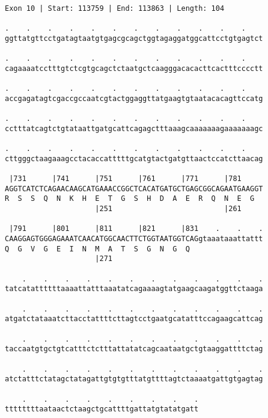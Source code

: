 \documentclass{article}
\begin{document}
\begin{Verbatim}
Exon 10 | Start: 113759 | End: 113863 | Length: 104
 
.    .    .    .    .    .    .    .    .    .    .    .    
ggttatgttcctgatagtaatgtgagcgcagctggtagaggatggcattcctgtgagtct
  
.    .    .    .    .    .    .    .    .    .    .    .    
cagaaaatcctttgtctcgtgcagctctaatgctcaagggacacacttcactttcccctt
  
.    .    .    .    .    .    .    .    .    .    .    .    
accgagatagtcgaccgccaatcgtactggaggttatgaagtgtaatacacagttccatg
  
.    .    .    .    .    .    .    .    .    .    .    .    
cctttatcagtctgtataattgatgcattcagagctttaaagcaaaaaaagaaaaaaagc
  
.    .    .    .    .    .    .    .    .    .    .    .    
cttgggctaagaaagcctacaccatttttgcatgtactgatgttaactccatcttaacag
  
 |731      |741      |751      |761      |771      |781     
AGGTCATCTCAGAACAAGCATGAAACCGGCTCACATGATGCTGAGCGGCAGAATGAAGGT
R  S  S  Q  N  K  H  E  T  G  S  H  D  A  E  R  Q  N  E  G  
                     |251                          |261     
  
 |791      |801      |811      |821      |831    .    .    .
CAAGGAGTGGGAGAAATCAACATGGCAACTTCTGGTAATGGTCAGgtaaataaattattt
Q  G  V  G  E  I  N  M  A  T  S  G  N  G  Q                 
                     |271                                   
  
    .    .    .    .    .    .    .    .    .    .    .    .
tatcatattttttaaaattatttaaatatcagaaaagtatgaagcaagatggttctaaga
  
    .    .    .    .    .    .    .    .    .    .    .    .
atgatctataaatcttacctattttcttagtcctgaatgcatatttccagaagcattcag
  
    .    .    .    .    .    .    .    .    .    .    .    .
taccaatgtgctgtcatttctctttattatatcagcaataatgctgtaaggattttctag
  
    .    .    .    .    .    .    .    .    .    .    .    .
atctatttctatagctatagattgtgtgtttatgttttagtctaaaatgattgtgagtag
  
    .    .    .    .    .    .    .    .    .
ttttttttaataactctaagctgcattttgattatgtatatgatt
\end{Verbatim}
\newpage
\end{document}

